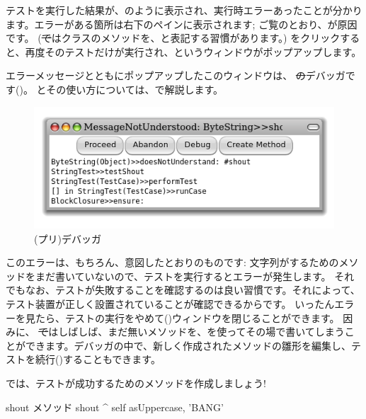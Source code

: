 \documentclass[a4paper,10pt,twoside]{book}
\begin{document}
テストを実行した結果が、のように表示され、実行時エラーあったことが分かります。エラーがある箇所は右下のペインに表示されます; ご覧のとおり、が原因です。
(\st ではクラスのメソッドを、と表記する習慣があります。)
 をクリックすると、再度そのテストだけが実行され、というウィンドウがポップアップします。

エラーメッセージとともにポップアップしたこのウィンドウは、 \st のデバッガです()。
とその使い方については、で解説します。

\begin{figure}[hbt]
\centerline {\includegraphics[width=\textwidth]{Predebugger}}
\caption{(プリ)デバッガ}
\end{figure}

このエラーは、もちろん、意図したとおりのものです: 文字列がするためのメソッドをまだ書いていないので、テストを実行するとエラーが発生します。
それでもなお、テストが失敗することを確認するのは良い習慣です。それによって、テスト装置が正しく設置されていることが確認できるからです。
いったんエラーを見たら、テストの実行をやめて()ウィンドウを閉じることができます。
因みに、 \st ではしばしば、まだ無いメソッドを、を使ってその場で書いてしまうことができます。デバッガの中で、新しく作成されたメソッドの雛形を編集し、テストを続行()することもできます。

では、テストが成功するためのメソッドを作成しましょう!

\begin{method}[shout]{shout メソッド}
shout
	^ self asUppercase, 'BANG'
\end{method}
\end{document}
